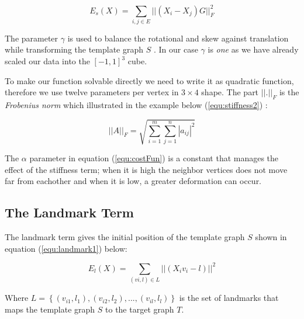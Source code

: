 \documentclass[../structure.tex]{subfiles}
\begin{document}
\begin{equation}
E_{s}(X) = \sum_{i,j \in E} ||(X_{i} - X_{j})G||_{F}^2
\label{equ:stiffness1}
\end{equation}

The parameter $\gamma$ is used to balance the rotational and skew  against translation while transforming the template graph $S$ \cite{Amberg2007}. In our case $\gamma$ is \textit{one} as we have already scaled our data into the $[-1, 1]^3$ cube.

To make our function solvable directly we need to write it as quadratic function, therefore we use twelve parameters per vertex in $3 \times 4$ shape. The part $||.||_{F}$ is the \textit{Frobenius norm} which illustrated in the example below (\ref{equ:stiffness2}) \cite{Amberg2007}: 

\begin{equation}
||A||_{F} = \sqrt{\sum_{i=1}^m \sum_{j=1}^n |a_{ij}|^2}
\label{equ:stiffness2}
\end{equation}

The $\alpha$ parameter in equation (\ref{equ:costFun}) is a constant that manages the effect of the stiffness term; when it is high the neighbor vertices does not move far from eachother and when it is low, a greater deformation can occur.

\subsection{The Landmark Term}
\hspace{2em}The landmark term gives the initial position of the template graph $S$ shown in equation (\ref{equ:landmark1}) below:

\begin{equation}
E_{l}(X) = \sum_{(vi,l) \in L}||(X_{i}v_{i} - l)||^2
\label{equ:landmark1}
\end{equation}

Where $L = \left\{(v_{i1},l_{1}),(v_{i2},l_{2}),...,(v_{il},l_{l})\right\}$ is the set of landmarks that maps the template graph $S$ to the target graph $T$.
\end{document}
